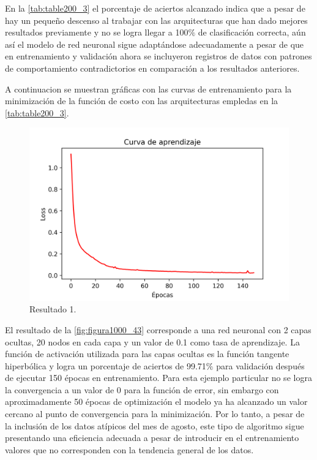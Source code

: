 En la \autoref{tab:table200_3} el porcentaje de aciertos alcanzado indica que a pesar de hay un pequeño descenso al trabajar con las arquitecturas que han dado mejores resultados previamente y no se logra llegar a 100$\%$ 
de clasificación correcta, aún así el modelo de red neuronal sigue adaptándose adecuadamente a pesar de que en entrenamiento y validación ahora se incluyeron registros de datos con patrones de comportamiento contradictorios 
en comparación a los resultados anteriores.

A continuacion se muestran gráficas con las curvas de entrenamiento para la minimización de la función de costo con las arquitecturas empledas en la \autoref{tab:table200_3}.

\clearpage

\begin{figure}[h]
	\centering
	\includegraphics[scale=0.71]{imgss193.png}
	\caption{Resultado 1.}
	\label{fig:figura1000_43}
\end{figure}

El resultado de la \autoref{fig:figura1000_43} corresponde a una red neuronal con 2 capas ocultas, 20 nodos en cada capa y un valor de 0.1 como tasa de aprendizaje. La función de activación utilizada para las capas ocultas es la 
función tangente hiperbólica y logra un porcentaje de aciertos de 99.71$\%$ para validación después de ejecutar 150 épocas en entrenamiento. 
Para esta ejemplo particular no se logra la convergencia a un valor de 0 para la función de error, sin embargo con aproximadamente 50 épocas de optimización el modelo ya ha alcanzado un valor cercano al punto de convergencia 
para la minimización. Por lo tanto, a pesar de la inclusión de los datos atípicos del mes de agosto, este tipo de algoritmo sigue presentando una eficiencia adecuada a pesar de introducir en el entrenamiento valores que no 
corresponden con la tendencia general de los datos. 

